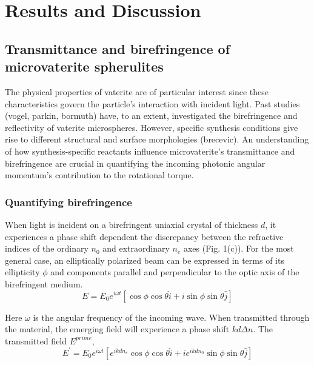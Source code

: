 \section*{Results and Discussion}

\subsection*{Transmittance and birefringence of microvaterite spherulites }
	The physical properties of vaterite are of particular interest since these characteristics govern the particle's interaction with incident light. Past studies (vogel, parkin, bormuth) have, to an extent, investigated the birefringence and reflectivity of vaterite microspheres. However,  specific synthesis conditions give rise to different structural and surface morphologies (brecevic). An understanding of how synthesis-specific  reactants influence microvaterite's transmittance and birefringence are crucial in quantifying the incoming photonic angular momentum's contribution to the rotational torque. 
\subsubsection*{Quantifying birefringence}
When light is incident on a birefringent uniaxial crystal of thickness $d$, it experiences
a phase shift dependent the discrepancy between the refractive indices of the ordinary $n_{0}$ and
extraordinary $n_{e}$ axes (Fig. 1(c)). For the most general case, an elliptically polarized beam 
can be expressed in terms of its ellipticity 
$\phi$ and components parallel and perpendicular to the optic axis of the birefringent medium.
\begin{equation}
E=E_{0}e^{i\omega t}[\cos\phi\cos\theta\hat{i}+i\sin\phi\sin\theta\hat{j}]
\end{equation}


Here $\omega$ is the angular frequency of the incoming wave. When
transmitted through the material, the emerging field will experience
a phase shift $kd\Delta n$. The transmitted field $E^{prime}$, 
\begin{equation}
E^{\prime}=E_{0}e^{i\omega t}[e^{ikdn_{e}}\cos\phi\cos\theta\hat{i}+ie^{ikdn_{0}}\sin\phi\sin\theta\hat{j}]
\end{equation}

